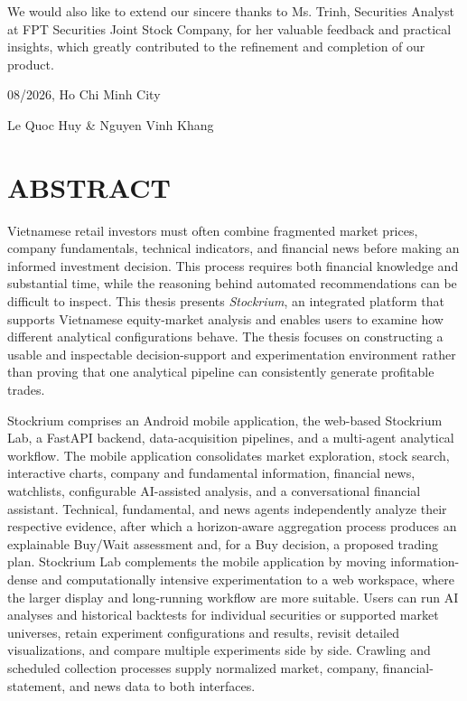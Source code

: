 \documentclass[12pt,a4paper,oneside]{report}
\begin{document}
We would also like to extend our sincere thanks to Ms. Trinh, Securities Analyst at FPT Securities Joint Stock Company, for her valuable feedback and practical insights, which greatly contributed to the refinement and completion of our product.

\begin{flushright}
08/2026, Ho Chi Minh City

Le Quoc Huy \& Nguyen Vinh Khang
\end{flushright}

\clearpage
{}
{}
\tableofcontents
\clearpage
{}
{}
\listoffigures
\clearpage
{}
{}
\listoftables
\clearpage

\chapter*{ABSTRACT}
{}

Vietnamese retail investors must often combine fragmented market prices, company fundamentals, technical indicators, and financial news before making an informed investment decision. This process requires both financial knowledge and substantial time, while the reasoning behind automated recommendations can be difficult to inspect. This thesis presents \textit{Stockrium}, an integrated platform that supports Vietnamese equity-market analysis and enables users to examine how different analytical configurations behave. The thesis focuses on constructing a usable and inspectable decision-support and experimentation environment rather than proving that one analytical pipeline can consistently generate profitable trades.

Stockrium comprises an Android mobile application, the web-based Stockrium Lab, a FastAPI backend, data-acquisition pipelines, and a multi-agent analytical workflow. The mobile application consolidates market exploration, stock search, interactive charts, company and fundamental information, financial news, watchlists, configurable AI-assisted analysis, and a conversational financial assistant. Technical, fundamental, and news agents independently analyze their respective evidence, after which a horizon-aware aggregation process produces an explainable Buy/Wait assessment and, for a Buy decision, a proposed trading plan. Stockrium Lab complements the mobile application by moving information-dense and computationally intensive experimentation to a web workspace, where the larger display and long-running workflow are more suitable. Users can run AI analyses and historical backtests for individual securities or supported market universes, retain experiment configurations and results, revisit detailed visualizations, and compare multiple experiments side by side. Crawling and scheduled collection processes supply normalized market, company, financial-statement, and news data to both interfaces.
\end{document}
